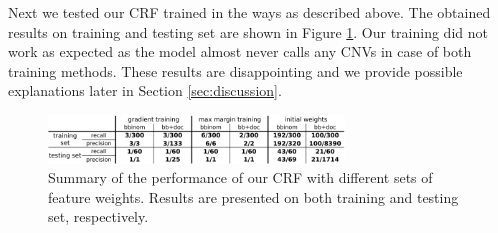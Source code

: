 Next we tested our CRF trained in the ways as described above. The obtained results on training and testing set are shown in Figure \ref{fig:CRFresAll}. Our training did not work as expected as the model almost never calls any CNVs in case of both training methods. These results are disappointing and we provide possible explanations later in Section \ref{sec:discussion}.

\begin{figure}
\caption{Summary of the performance of our CRF with different sets of feature weights. Results are presented on both training and testing set, respectively.}
\label{fig:CRFresAll}
\centering
\includegraphics[width=0.7\textwidth]{figures/crf_res_all}
\end{figure}

%
%
%


